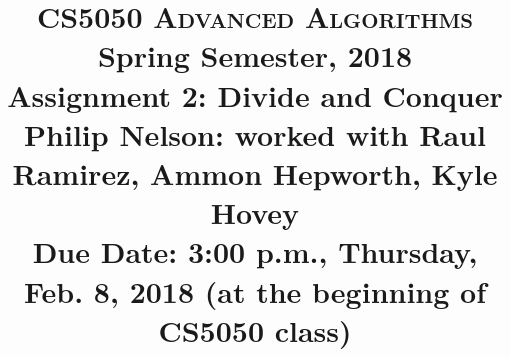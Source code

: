 \documentclass[11pt]{article}
\begin{document}
\baselineskip=14.0pt

\title{CS5050 \textsc{Advanced Algorithms}
\\{\Large Spring Semester, 2018}
\\ Assignment 2: Divide and Conquer
\\{\Large {\bf Philip Nelson}: worked with Raul Ramirez, Ammon Hepworth, Kyle Hovey}
\\ {\large {\bf Due Date: 3:00 p.m.}, Thursday, Feb. 8, 2018 ({\bf at the beginning of CS5050 class})}}
\date{}

\maketitle

\vspace{-0.9in}
\end{document}
